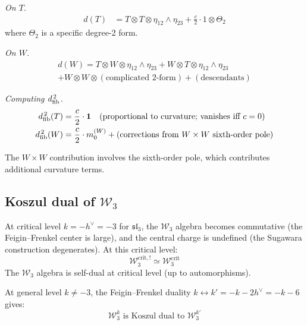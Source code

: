 \begin{computation}
\emph{On $T$.}
\begin{align}
d(T) &= T \otimes T \otimes \eta_{12} \wedge \eta_{23} + \frac{c}{2} \cdot 1 \otimes \Theta_2
\end{align}
where $\Theta_2$ is a specific degree-2 form.

\emph{On $W$.}
\begin{multline}
d(W) = T \otimes W \otimes \eta_{12} \wedge \eta_{23} + W \otimes T \otimes \eta_{12} \wedge \eta_{23} \\
+ W \otimes W \otimes (\text{complicated 2-form}) + (\text{descendants})
\end{multline}

\emph{Computing $d_{\mathrm{fib}}^{\,2}$.}
\begin{align}
d_{\mathrm{fib}}^{\,2}(T) &= \frac{c}{2} \cdot \mathbf{1} \quad \text{(proportional to curvature; vanishes iff $c = 0$)} \\
d_{\mathrm{fib}}^{\,2}(W) &= \frac{c}{2} \cdot m_0^{(W)} + (\text{corrections from } W \times W \text{ sixth-order pole})
\end{align}

The $W \times W$ contribution involves the sixth-order pole, which contributes additional curvature terms.
\end{computation}

\subsection{\texorpdfstring{Koszul dual of $\mathcal{W}_3$}{Koszul dual of W 3}}

\begin{theorem}\label{thm:w3-koszul-dual}
At critical level $k = -h^\vee = -3$ for $\mathfrak{sl}_3$, the $\mathcal{W}_3$ algebra becomes commutative (the Feigin--Frenkel center is large), and the central charge is undefined (the Sugawara construction degenerates). At this critical level:
\begin{equation}
\mathcal{W}_3^{\text{crit},!} \simeq \mathcal{W}_3^{\text{crit}}
\end{equation}
The $\mathcal{W}_3$ algebra is self-dual at critical level (up to automorphisms).

At general level $k \neq -3$, the Feigin--Frenkel duality $k \leftrightarrow k' = -k - 2h^\vee = -k-6$ gives:
\begin{equation}
\mathcal{W}_3^{k} \text{ is Koszul dual to } \mathcal{W}_3^{k'}
\end{equation}
\end{theorem}

